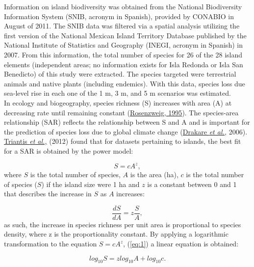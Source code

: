 \documentclass{article} %
\begin{document}
Information on island biodiversity was obtained from the National Biodiversity
Information System (SNIB, acronym in Spanish), provided by CONABIO in August of
2011. The SNIB data was filtered via a spatial analysis utilizing the first version of
the National Mexican Island Territory Database published by the National Institute of
Statistics and Geography (INEGI, acronym in Spanish) in 2007. From this
information, the total number of species for 26 of the 28 island elements
(independent areas; no information exists for Isla Redonda or Isla San Benedicto) of
this study were extracted. The species targeted were terrestrial animals and native
plants (including endemics). With this data, species loss due sea-level rise in each
one of the 1 m, 3 m, and 5 m scenarios was estimated.\\

In ecology and biogeography, species richness (S) increases with area (A) at
decreasing rate until remaining constant (\hyperlink{rosenzweig}{Rosenzweig, 1995}). The species-area
relationship (SAR) reflects the relationship between S and A and is important for the
prediction of species loss due to global climate change (\hyperlink{drakare}{Drakare \textit{et al.,}} 2006).\\

\hyperlink{drakare}{Triantis \textit{et al.,}} (2012) found that for datasets pertaining to islands, the best fit for a SAR is obtained by the power model:

\begin{equation}
\label{eq:1}
S=cA^{z},
\end{equation}
where $S$ is the total number of species, $A$ is the area (ha), $c$ is the total number of
species ($S$) if the island size were 1 ha and $z$ is a constant between 0 and 1 that
describes the increase in $S$ as $A$ increases:

\begin{equation}
\label{eq:2}
\frac{dS}{dA}=z\frac{S}{A},
\end{equation}
as such, the increase in species richness per unit area is proportional to species
density, where z is the proportionality constant. By applying a logarithmic
transformation to the equation $S=cA^{z}$, (\ref{eq:1}) a linear equation is obtained:



\begin{equation}
\label{eq:3}
log_{10}S=zlog_{10}A+log_{10}c.
\end{equation}
\end{document}
